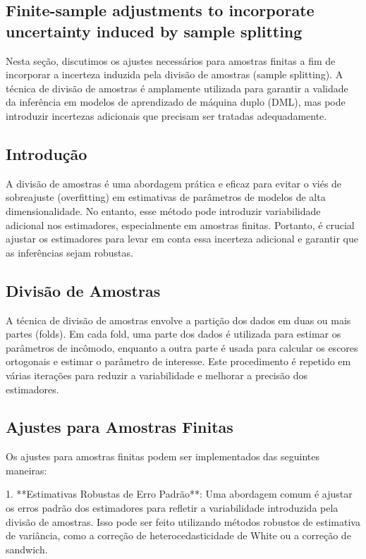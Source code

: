 \documentclass[a4paper,12pt]{article}[abntex2]
\begin{document}
\subsection{Finite-sample  adjustments  to incorporate  uncertainty  induced by sample splitting}

Nesta seção, discutimos os ajustes necessários para amostras finitas a fim de incorporar a incerteza induzida pela divisão de amostras (sample splitting). A técnica de divisão de amostras é amplamente utilizada para garantir a validade da inferência em modelos de aprendizado de máquina duplo (DML), mas pode introduzir incertezas adicionais que precisam ser tratadas adequadamente.

\subsection*{Introdução}

A divisão de amostras é uma abordagem prática e eficaz para evitar o viés de sobreajuste (overfitting) em estimativas de parâmetros de modelos de alta dimensionalidade. No entanto, esse método pode introduzir variabilidade adicional nos estimadores, especialmente em amostras finitas. Portanto, é crucial ajustar os estimadores para levar em conta essa incerteza adicional e garantir que as inferências sejam robustas.

\subsection*{Divisão de Amostras}

A técnica de divisão de amostras envolve a partição dos dados em duas ou mais partes (folds). Em cada fold, uma parte dos dados é utilizada para estimar os parâmetros de incômodo, enquanto a outra parte é usada para calcular os escores ortogonais e estimar o parâmetro de interesse. Este procedimento é repetido em várias iterações para reduzir a variabilidade e melhorar a precisão dos estimadores.

\subsection*{Ajustes para Amostras Finitas}

Os ajustes para amostras finitas podem ser implementados das seguintes maneiras:

1. **Estimativas Robustas de Erro Padrão**: Uma abordagem comum é ajustar os erros padrão dos estimadores para refletir a variabilidade introduzida pela divisão de amostras. Isso pode ser feito utilizando métodos robustos de estimativa de variância, como a correção de heterocedasticidade de White ou a correção de sandwich.
\end{document}
